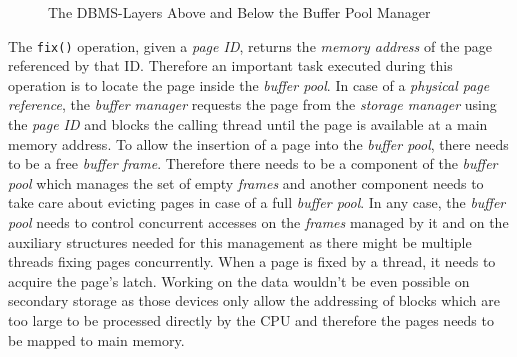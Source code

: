 \begin{@empty}
\begin{figure}[ht!]
{
		}
		\caption{The DBMS-Layers Above and Below the Buffer Pool Manager}
		\label{fig:bufferarchitecture}
	\end{figure}
\end{@empty}
	
	The \lstinline{fix()} operation, given a \emph{page ID}, returns the \emph{memory address} of the page referenced by that ID. Therefore an important task executed during this operation is to locate the page inside the \emph{buffer pool}. In case of a \emph{physical page reference}, the \emph{buffer manager} requests the page from the \emph{storage manager} using the \emph{page ID} and blocks the calling thread until the page is available at a main memory address. To allow the insertion of a page into the \emph{buffer pool}, there needs to be a free \emph{buffer frame}. Therefore there needs to be a component of the \emph{buffer pool} which manages the set of empty \emph{frames} and another component needs to take care about evicting pages in case of a full \emph{buffer pool}. In any case, the \emph{buffer pool} needs to control concurrent accesses on the \emph{frames} managed by it and on the auxiliary structures needed for this management as there might be multiple threads fixing pages concurrently. When a page is fixed by a thread, it needs to acquire the page's latch. Working on the data wouldn't be even possible on secondary storage as those devices only allow the addressing of blocks which are too large to be processed directly by the CPU and therefore the pages needs to be mapped to main memory.
	

